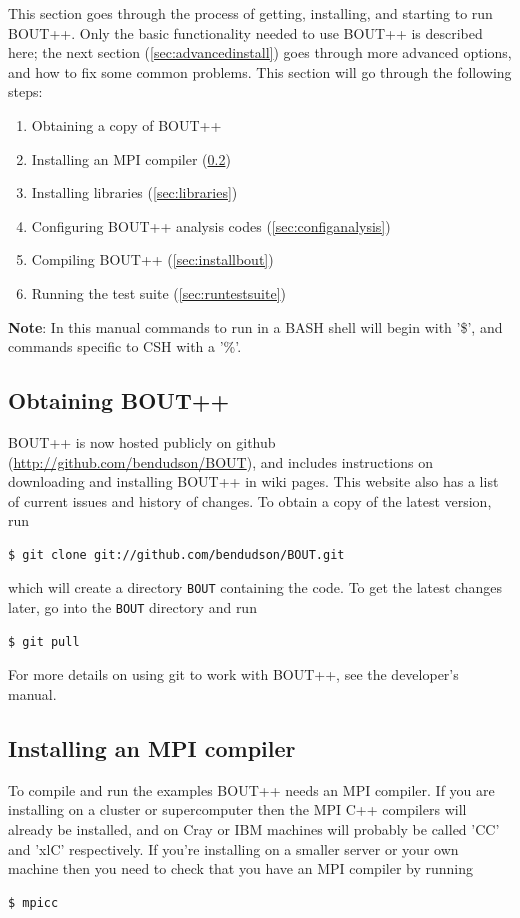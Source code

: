 \documentclass[12pt]{article}
\begin{document}
This section goes through the process of getting, installing, and
starting to run BOUT++. Only the basic functionality needed to use BOUT++
is described here; the next section (\ref{sec:advancedinstall}) goes through
more advanced options, and how to fix some common problems. 
This section will go through the following steps:
\begin{enumerate}
\item Obtaining a copy of BOUT++
\item Installing an MPI compiler (\ref{sec:installmpi})
\item Installing libraries (\ref{sec:libraries})
\item Configuring BOUT++ analysis codes (\ref{sec:configanalysis})
\item Compiling BOUT++ (\ref{sec:installbout})
\item Running the test suite (\ref{sec:runtestsuite})
\end{enumerate}

{\bf Note}: In this manual commands to run in a BASH shell will begin with '\$', and commands specific to CSH with a '\%'.

\subsection{Obtaining BOUT++}

BOUT++ is now hosted publicly on github (\url{http://github.com/bendudson/BOUT}), and includes
instructions on downloading and installing BOUT++ in wiki pages. This website also has a list of current  issues
and history of changes. To obtain a copy of the latest version, run 
\begin{verbatim}
$ git clone git://github.com/bendudson/BOUT.git
\end{verbatim}
which will create a directory \texttt{BOUT} containing the code. To get the latest changes later,
go into the  \texttt{BOUT} directory and run
\begin{verbatim}
$ git pull
\end{verbatim}
For more details on using git to work with BOUT++, see the developer's manual.

\subsection{Installing an MPI compiler}
\label{sec:installmpi}

To compile and run the examples BOUT++ needs an MPI compiler. 
If you are installing on a cluster or supercomputer then the MPI
C++ compilers will already be installed, and on Cray or IBM
machines will probably be called 'CC' and 'xlC' respectively. 
If you're installing on a smaller server or your own machine then you need
to check that you have an MPI compiler by running 
\begin{verbatim}
$ mpicc
\end{verbatim}
\end{document}
